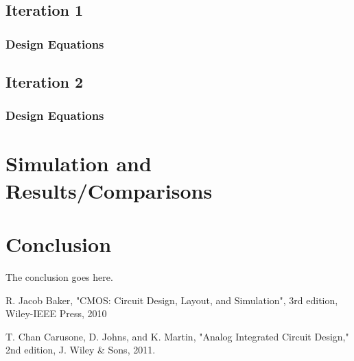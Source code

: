 \documentclass[conference]{IEEEtran}
\begin{document}
\subsection{Iteration 1}
\subsubsection{Design Equations}
\subsection{Iteration 2}
\subsubsection{Design Equations}
\section{Simulation and Results/Comparisons}
\section{Conclusion}
The conclusion goes here.



%
%
%
\newpage
\begin{thebibliography}{1}
R. Jacob Baker, "CMOS: Circuit Design, Layout, and Simulation", 3rd edition, Wiley-IEEE Press, 2010

T. Chan Carusone, D. Johns, and K. Martin, "Analog Integrated Circuit Design," 2nd edition, J. Wiley \& Sons, 2011.
\end{thebibliography}
\end{document}
